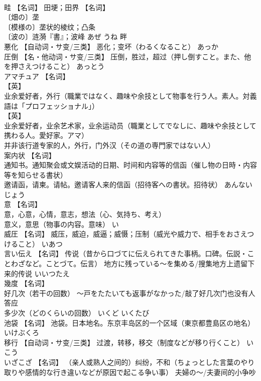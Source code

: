 \documentclass[8pt]{extreport}
\begin{document}
\begin{CJK}{UTF8}{min}
\\	畦	【名词】 田埂；田界 【名词】 
\\	〔畑の〕垄 
\\	〔模様の〕垄状的棱纹；凸条 
\\	〔波の〕涟漪『書』；波峰	あぜ うね	畔
\\	悪化	【自动词・サ变/三类】 恶化；变坏（わるくなること）	あっか	
\\	圧倒	【名・他动词・サ变/三类】 压倒，胜过，超过（押し倒すこと。また、他を押さえつけること）	あっとう	
\\	アマチュア	【名词】 
\\	【英】
\\	业余爱好者，外行（職業ではなく、趣味や余技として物事を行う人。素人。対義語は「プロフェッショナル」） 
\\	【英】
\\	业余爱好者，业余艺术家，业余运动员（職業としてでなしに、趣味や余技として携わる人。愛好家。アマ） 
\\	并非该行道专家的人，外行，门外汉（その道の専門家ではない人）		
\\	案内状	【名词】 
\\	通知书。通知聚会或文娱活动的日期、时间和内容等的信函（催し物の日時・内容等を知らせる書状） 
\\	邀请函，请柬。请帖。邀请客人来的信函（招待客への書状。招待状）	あんないじょう	
\\	意	【名词】 
\\	意，心意，心情，意志，想法（心、気持ち、考え） 
\\	意义，意思（物事の内容。意味）	い	
\\	威圧	【名词】 威压，威迫，威逼；威慑；压制（威光や威力で、相手をおさえつけること）	いあつ	
\\	言い伝え	【名词】 传说（昔から口づてに伝えられてきた事柄。口碑。伝説・ことわざなど。ことづて。伝言） 地方に残っている～を集める/搜集地方上遗留下来的传说	いいつたえ	
\\	幾度	【名词】 
\\	好几次（若干の回数） ～戸をたたいても返事がなかった/敲了好几次门也没有人答应 
\\	多少次（どのくらいの回数）	いくど いくたび	
\\	池袋	【名词】 池袋。日本地名。东京丰岛区的一个区域（東京都豊島区の地名）	いけぶくろ	
\\	移行	【自动词・サ变/三类】 过渡，转移，移交（制度などが移り行くこと）	いこう	
\\	いざこざ	【名词】 （亲人或熟人之间的）纠纷，不和（ちょっとした言葉のやり取りや感情的な行き違いなどが原因で起こる争い事） 夫婦の～/夫妻间的小争吵		

\end{CJK}
\end{document}

